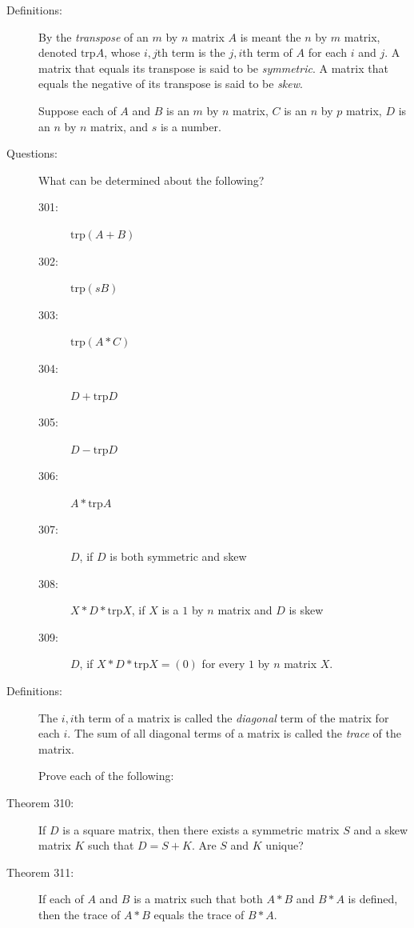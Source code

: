 \documentclass{article}
\begin{document}
\begin{description}

  \item[Definitions:] By the \emph{transpose} of an $m$ by $n$ matrix $A$ is meant the $n$ by $m$ matrix, denoted $\text{trp} A$, whose $i,j$th term is the $j,i$th term of $A$ for each $i$ and $j$. A matrix that equals its transpose is said to be \emph{symmetric}. A matrix that equals the negative of its transpose is said to be \emph{skew}.

  \item[] Suppose each of $A$ and $B$ is an $m$ by $n$ matrix, $C$ is an $n$ by $p$ matrix, $D$ is an $n$ by $n$ matrix, and $s$ is a number.

  \item[Questions:] What can be determined about the following?
    \begin{description}
      \item[301:] $\text{trp} (A+B)$
      \item[302:] $\text{trp} (sB)$
      \item[303:] $\text{trp} (A*C)$
      \item[304:] $D+\text{trp} D$
      \item[305:] $D-\text{trp} D$
      \item[306:] $A*\text{trp} A$
      \item[307:] $D$, if $D$ is both symmetric and skew
      \item[308:] $X*D*\text{trp} X$, if $X$ is a $1$ by $n$ matrix and $D$ is skew
      \item[309:] $D$, if $X*D*\text{trp} X=(0)$ for every $1$ by $n$ matrix $X$.
    \end{description}

  \item[Definitions:] The $i,i$th term of a matrix is called the \emph{diagonal} term of the matrix for each $i$. The sum of all diagonal terms of a matrix is called the \emph{trace} of the matrix.

  \item[] Prove each of the following:

  \item[Theorem 310:] If $D$ is a square matrix, then there exists a symmetric matrix $S$ and a skew matrix $K$ such that $D=S+K$. Are $S$ and $K$ unique?

  \item[Theorem 311:] If each of $A$ and $B$ is a matrix such that both $A*B$ and $B*A$ is defined, then the trace of $A*B$ equals the trace of $B*A$.

\end{description}
\end{document}
